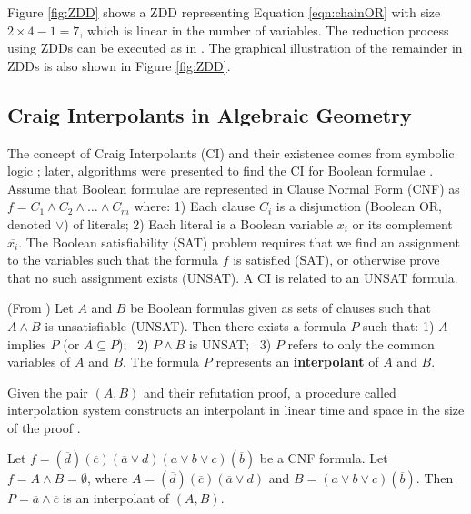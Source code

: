 Figure \ref{fig:ZDD} shows a ZDD representing 
Equation \ref{eqn:chainOR} with size $2\times4 -1 = 7$, which is linear in the number of variables.
The reduction process using ZDDs can be executed as in \cite{polybori:2009}. The graphical illustration 
of the remainder in ZDDs is also shown in Figure \ref{fig:ZDD}. 

\subsection{Craig Interpolants in Algebraic Geometry}
The concept of Craig Interpolants (CI) and their existence comes from
symbolic logic \cite{craig-interpolate}; later, algorithms were
presented to find the CI for Boolean formulae
\cite{pudlak:ci} \cite{mcmillan2003interpolation}. Assume that Boolean
formulae are represented in Clause Normal Form (CNF) as 
$f = C_1 \wedge C_2 \wedge \dots \wedge C_m$ where: 1) Each clause
$C_i$ is a disjunction (Boolean OR, denoted $\vee$) of literals; 2)
Each literal is a Boolean variable $x_i$ or its complement
$\overline{x_i}$. 
The Boolean satisfiability (SAT) problem requires that we find an
assignment to the variables such that the formula $f$ is satisfied
(SAT), or otherwise prove that no such assignment exists (UNSAT). 
A CI is related to an UNSAT formula. 

\begin{Definition}
(From \cite{mcmillan2003interpolation}) Let $A$ and $B$ be Boolean
  formulas given as sets of clauses such that $A \wedge B$ is
  unsatisfiable (UNSAT). Then there exists a formula $P$ such that: 
1) $A$ implies $P$ (or $A \subseteq P$); ~2) $P \wedge B$ is UNSAT; ~3)
$P$ refers to only the common variables of $A$ and $B$. The formula
$P$ represents an {\bf interpolant} of $A$ and $B$. 

Given  the pair $(A, B)$ and their refutation proof, a procedure
called interpolation system constructs an interpolant in linear time
and space in the size of the proof \cite{mcmillan2003interpolation}
\cite{pudlak:ci}. 
\end{Definition}

\begin{Example}\label{ex1}
Let $f = (\overline{d})(\overline{c})(\overline{a}\vee d)(a
\vee b \vee c)(\overline{b})$ be a CNF formula. Let $f = A \wedge B =
\emptyset$, where $A = (\overline{d})(\overline{c})(\overline{a}\vee
d)$ and  $B = (a \vee b \vee c)(\overline{b})$. Then $P = \overline{a}
\wedge \overline{c}$ is an interpolant of $(A, B)$. 
\end{Example}

